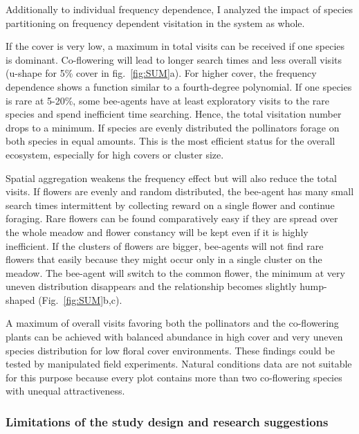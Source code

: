 Additionally to individual frequency dependence, I analyzed the impact of species partitioning on frequency dependent visitation in the system as whole. 

If the cover is very low,  a maximum in total visits can be received if one species is dominant. Co-flowering will lead to longer search times and less overall visits (u-shape for 5\% cover in fig.~\ref{fig:SUM}a). For higher cover, the frequency dependence shows a function similar to a fourth-degree polynomial. If one species is rare at 5-20\%, some bee-agents have at least exploratory visits to the rare species and spend inefficient time searching. Hence, the total visitation number drops to a minimum. If species are evenly distributed the pollinators forage on both species in equal amounts. This is the most efficient status for the overall ecosystem, especially for high covers or cluster size. 

Spatial aggregation weakens the frequency effect but will also reduce the total visits. If flowers are evenly and random distributed, the bee-agent has many small search times intermittent by collecting reward on a single flower and continue foraging. Rare flowers can be found comparatively easy if they are spread over the whole meadow and flower constancy will be kept even if it is highly inefficient. If the clusters of flowers are bigger, bee-agents will not find rare flowers that easily because they might occur only in a single cluster on the meadow. The bee-agent will switch to the common flower, the minimum at very uneven distribution disappears and the relationship becomes slightly hump-shaped (Fig.~\ref{fig:SUM}b,c). 

A maximum of overall visits favoring both the pollinators and the co-flowering plants can be achieved with balanced abundance in high cover and very uneven species distribution for low floral cover environments. These findings could be tested by manipulated field experiments. Natural conditions data are not suitable for this purpose because every plot contains more than two co-flowering species with unequal attractiveness.  


\subsubsection*{Limitations of the study design and research suggestions}

